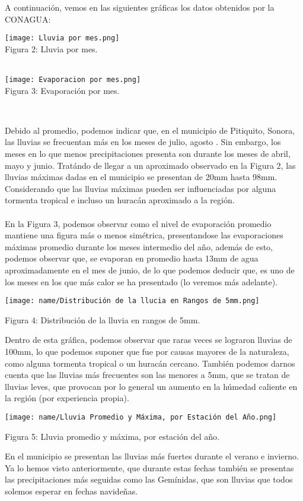 \documentclass{article}
\begin{document}
A continuación, vemos en las siguientes gráficas los datos obtenidos por la CONAGUA:
\begin{center}
\texttt{[image: Lluvia por mes.png]}\\
\caption{\small Figura 2: Lluvia por mes.}\\
\texttt{[image: Evaporacion por mes.png]}\\
\caption{\small Figura 3: Evaporación por mes.}\\
\end{center}  
Debido al promedio, podemos indicar que, en el municipio de Pitiquito, Sonora, las lluvias se frecuentan más en los meses de julio, agosto . Sin embargo, los meses en lo que menos precipitaciones presenta son durante los meses de abril, mayo y junio. 
Tratándo de llegar a un aproximado observado en la Figura 2, las lluvias máximas dadas en el municipio se presentan de 20mm hasta 98mm. Considerando que las lluvias máximas pueden ser influenciadas por alguna tormenta tropical e incluso un huracán aproximado a la región.\\ \\
En la Figura 3, podemos observar como el nivel de evaporación promedio mantiene una figura más o menos simétrica, presentandose las evaporaciones máximas promedio durante los meses intermedio del año, además de esto, podemos observar que, se evaporan en promedio hasta 13mm de agua aproximadamente en el mes de junio, de lo que podemos deducir que, es uno de los meses en los que más calor se ha presentado (lo veremos más adelante).
\begin{center}
\texttt{[image: name/Distribución de la llucia en Rangos de 5mm.png]}
\caption{\small Figura 4: Distribución de la lluvia en rangos de 5mm.}
\end{center}
Dentro de esta gráfica, podemos observar que raras veces se lograron lluvias de 100mm, lo que podemos suponer que fue por causas mayores de la naturaleza, como alguna tormenta tropical o un huracán cercano. También podemos darnos cuenta que las lluvias más frecuentes son las menores a 5mm, que se tratan de lluvias leves, que provocan por lo general un aumento en la húmedad caliente en la región (por experiencia propia).
\begin{center}
\texttt{[image: name/Lluvia Promedio y Máxima, por Estación del Año.png]}
\caption{\small Figura 5: Lluvia promedio y máxima, por estación del año.}
\end{center}
En el municipio se presentan las lluvias más fuertes durante el verano e invierno. Ya lo hemos visto anteriormente, que durante estas fechas también se presentas las precipitaciones más seguidas como las Gemínidas, que son lluvias que todos solemos esperar en fechas navideñas.
\end{document}
